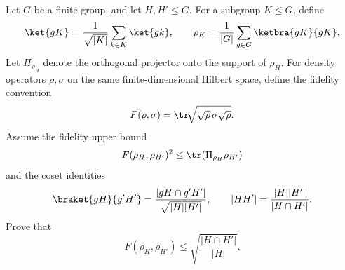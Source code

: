 Let $G$ be a finite group, and let $H,H'\leq G$.  For a subgroup $K\leq G$, define
$$
    \ket{gK}
    =
    \frac1{\sqrt{|K|}}\sum_{k\in K}\ket{gk},
    \qquad
    \rho_K=
    \frac1{|G|}
    \sum_{g\in G}\ketbra{gK}{gK}.
$$
Let $\Pi_{\rho_H}$ denote the orthogonal projector onto the support of $\rho_H$.  For density operators $\rho,\sigma$ on the same finite-dimensional Hilbert space, define the fidelity convention
$$
    F(\rho,\sigma)=\tr\!\sqrt{\sqrt{\rho}\,\sigma\sqrt{\rho}} .
$$
Assume the fidelity upper bound
$$
    F(\rho_H,\rho_{H'})^2
    \leq
    \tr(\Pi_{\rho_H}\rho_{H'})
$$
and the coset identities
$$
    \braket{gH}{g'H'}
    =
    \frac{|gH\cap g'H'|}{\sqrt{|H||H'|}},
    \qquad
    |HH'|=\frac{|H||H'|}{|H\cap H'|}.
$$
Prove that
$$
    F(\rho_H,\rho_{H'})
    \leq
    \sqrt{\frac{|H\cap H'|}{|H|}}.
$$
